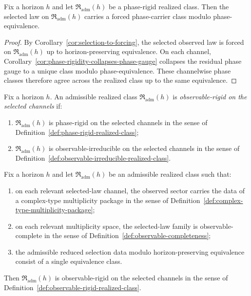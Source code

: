 \begin{corollary}
\label{cor:realized-phase-rigidity-forcing}
Fix a horizon $h$ and let $\mathfrak R_{\mathrm{adm}}(h)$ be a phase-rigid
realized class. Then the selected law on $\mathfrak R_{\mathrm{adm}}(h)$
carries a forced phase-carrier class modulo phase-equivalence.
\end{corollary}

\begin{proof}
By Corollary~\ref{cor:selection-to-forcing}, the selected observed law is
forced on $\mathfrak R_{\mathrm{adm}}(h)$ up to horizon-preserving
equivalence. On each channel,
Corollary~\ref{cor:phase-rigidity-collapses-phase-gauge} collapses the
residual phase gauge to a unique class modulo phase-equivalence. These
channelwise phase classes therefore agree across the realized class up to the
same equivalence.
\end{proof}

\begin{definition}
\label{def:observable-rigid-realized-class}
Fix a horizon $h$. An admissible realized class
$\mathfrak R_{\mathrm{adm}}(h)$ is \emph{observable-rigid on the selected
channels} if:
\begin{enumerate}[label=(\roman*), leftmargin=2em, itemsep=0.2em]
\item $\mathfrak R_{\mathrm{adm}}(h)$ is phase-rigid on the selected channels
      in the sense of Definition~\ref{def:phase-rigid-realized-class};
\item $\mathfrak R_{\mathrm{adm}}(h)$ is observable-irreducible on the
      selected channels in the sense of
      Definition~\ref{def:observable-irreducible-realized-class}.
\end{enumerate}
\end{definition}

\begin{corollary}
\label{cor:observable-complete-implies-observable-rigid}
Fix a horizon $h$ and let $\mathfrak R_{\mathrm{adm}}(h)$ be an admissible
realized class such that:
\begin{enumerate}[label=(\roman*), leftmargin=2em, itemsep=0.2em]
\item on each relevant selected-law channel, the observed sector carries the
      data of a complex-type multiplicity package in the sense of
      Definition~\ref{def:complex-type-multiplicity-package};
\item on each relevant multiplicity space, the selected-law family is
      observable-complete in the sense of
      Definition~\ref{def:observable-completeness};
\item the admissible reduced selection data modulo horizon-preserving
      equivalence consist of a single equivalence class.
\end{enumerate}
Then $\mathfrak R_{\mathrm{adm}}(h)$ is observable-rigid on the selected
channels in the sense of
Definition~\ref{def:observable-rigid-realized-class}.
\end{corollary}

